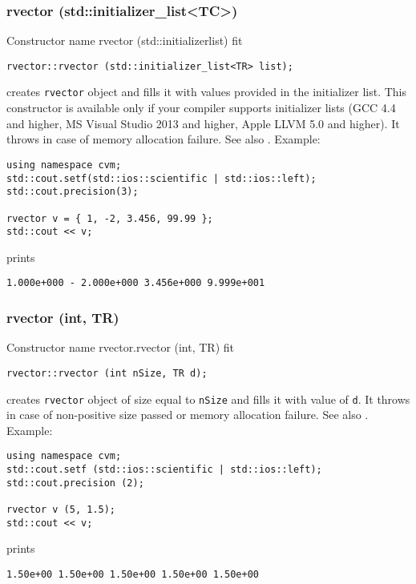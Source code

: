 \subsubsection{rvector (std::initializer\_list<TC>)}
Constructor%
\pdfdest name {rvector (std::initializerlist)} fit
\begin{verbatim}
rvector::rvector (std::initializer_list<TR> list);
\end{verbatim}
creates \verb"rvector" object and fills it with values provided in the initializer list.
This constructor is available only if your compiler supports initializer lists
(GCC 4.4 and higher, MS Visual Studio 2013 and higher, Apple LLVM 5.0 and higher).
It throws  
in case of memory allocation failure.
See also .
Example:
\begin{Verbatim}
using namespace cvm;
std::cout.setf(std::ios::scientific | std::ios::left);
std::cout.precision(3);

rvector v = { 1, -2, 3.456, 99.99 };
std::cout << v;
\end{Verbatim}
prints
\begin{Verbatim}
1.000e+000 - 2.000e+000 3.456e+000 9.999e+001
\end{Verbatim}
\newpage




\subsubsection{rvector (int, TR)}
Constructor%
\pdfdest name {rvector.rvector (int, TR)} fit
\begin{verbatim}
rvector::rvector (int nSize, TR d);
\end{verbatim}
creates \verb"rvector" object of size equal to \verb"nSize"
and fills it with value of \verb"d".
It throws  
in case of non-positive size passed or memory allocation failure.
See also .
Example:
\begin{Verbatim}
using namespace cvm;
std::cout.setf (std::ios::scientific | std::ios::left); 
std::cout.precision (2);

rvector v (5, 1.5);
std::cout << v;
\end{Verbatim}
prints
\begin{Verbatim}
1.50e+00 1.50e+00 1.50e+00 1.50e+00 1.50e+00
\end{Verbatim}
\newpage



